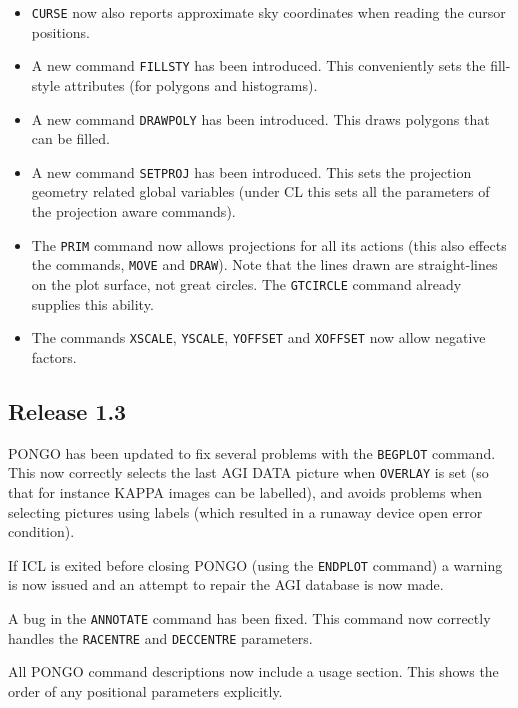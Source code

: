 \documentclass[twoside,11pt]{article}
\newcommand{\htmlref}[2]{#1}
\newcommand{\xref}[3]{#1}
\renewcommand{\_}{\texttt{\symbol{95}}}
\newcommand{\pnam}[1]{{\tt #1}}
\newcommand{\cnam}[1]{{\tt #1}}
\newcommand{\iref} [1]{\htmlref{#1}{#1}}
\begin{document}
\begin{itemize}
\item \cnam{\iref{CURSE}} now also reports approximate sky coordinates when
reading the cursor positions.

\item A new command \cnam{\iref{FILLSTY}} has been introduced. This
conveniently sets the fill-style attributes (for polygons and
histograms).

\item A new command \cnam{\iref{DRAWPOLY}} has been introduced. This
draws polygons  that can be filled.

\item A new command \cnam{\iref{SETPROJ}} has been introduced. This sets the
projection geometry related global variables (under CL this sets all
the parameters of the projection aware commands).

\item The \cnam{\iref{PRIM}} command now allows projections for all its
actions (this also effects the commands, \cnam{\iref{MOVE}} and
\cnam{\iref{DRAW}}). Note that the lines drawn are straight-lines on
the plot surface, not great circles. The \cnam{\iref{GT\_CIRCLE}}
command already supplies this ability.

\item The commands \cnam{\iref{XSCALE}}, \cnam{\iref{YSCALE}},
\cnam{\iref{YOFFSET}} and \cnam{\iref{XOFFSET}} now allow
negative factors.

\end{itemize}

\subsection{Release 1.3}

PONGO has been updated to fix several problems with the
\cnam{\iref{BEGPLOT}} command. This now correctly selects the last AGI
DATA picture when \pnam{OVERLAY} is set (so that for instance
\xref{KAPPA}{sun95}{} images can be labelled), and avoids problems
when selecting pictures using labels (which resulted in a runaway
device open error condition).

If ICL is exited before closing PONGO (using the \cnam{\iref{ENDPLOT}}
command) a warning is now issued and an attempt to repair the AGI
database is now made.

A bug in the \cnam{\iref{ANNOTATE}} command has been fixed. This command now
correctly handles the \pnam{RACENTRE} and \pnam{DECCENTRE} parameters.

All PONGO command descriptions now include a usage section. This
shows the order of any positional parameters explicitly.
\end{document}
